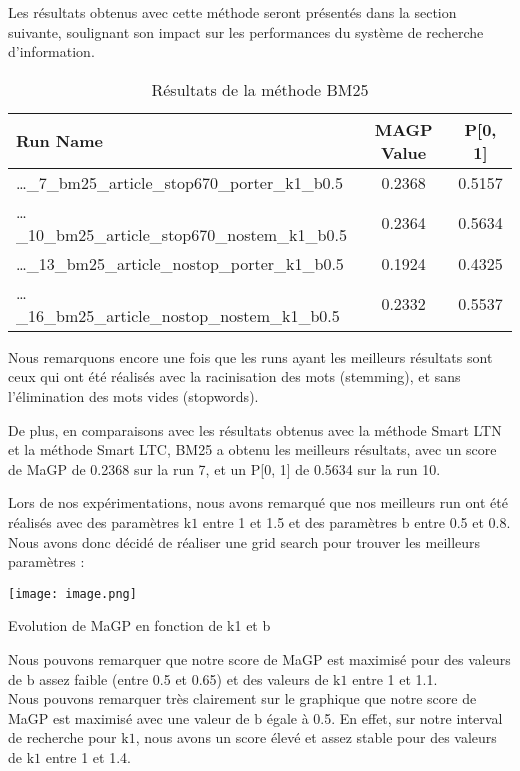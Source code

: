 \documentclass[a4paper, 12pt]{article}
\begin{document}
Les résultats obtenus avec cette méthode seront présentés dans la section suivante,
soulignant son impact sur les performances du système de recherche d'information.


\begin{table}[h]
  \centering
  \begin{tabular}{l c c}
      \toprule
      \textbf{Run Name} & \textbf{MAGP Value} & \textbf{P[0, 1]} \\
      \midrule
      \dots\_7\_bm25\_article\_stop670\_porter\_k1\_b0.5 & 0.2368 & 0.5157 \\
      \dots\_10\_bm25\_article\_stop670\_nostem\_k1\_b0.5 & 0.2364 & 0.5634 \\
      \dots\_13\_bm25\_article\_nostop\_porter\_k1\_b0.5 & 0.1924 & 0.4325 \\
      \dots\_16\_bm25\_article\_nostop\_nostem\_k1\_b0.5 & 0.2332 & 0.5537 \\
      \bottomrule
  \end{tabular}
  \caption{Résultats de la méthode BM25}
  \label{tab:result_bm25}
\end{table}

Nous remarquons encore une fois que les runs ayant les meilleurs résultats sont ceux qui ont été réalisés 
avec la racinisation des mots (stemming), et sans l'élimination des mots vides (stopwords).

De plus, en comparaisons avec les résultats obtenus avec la méthode Smart LTN et la méthode Smart LTC, BM25 
a obtenu les meilleurs résultats, avec un score de MaGP de 0.2368 sur la run 7, et un P[0, 1] de 0.5634 sur la run 10.
 
Lors de nos expérimentations, nous avons remarqué que nos meilleurs run ont été réalisés avec des paramètres $\text{k1}$ entre 1 et 1.5 et des paramètres $\text{b}$ entre 0.5 et 0.8.
Nous avons donc décidé de réaliser une grid search pour trouver les meilleurs paramètres :


\begin{table}[!h]
    \begin{minipage}{0.55\linewidth}
        \centering
        \texttt{[image: image.png]}
        \label{fig:enter-label}
        \caption{Evolution de MaGP en fonction de k1 et b}
    \end{minipage}%
    \hspace{0.05\linewidth} %
    \begin{minipage}{0.45\linewidth}
        Nous pouvons remarquer que notre score de MaGP est maximisé pour des valeurs de $\text{b}$ 
        assez faible (entre 0.5 et 0.65) et des valeurs de $\text{k1}$ entre 1 et 1.1. \\

        Nous pouvons remarquer très clairement sur le graphique que notre score de MaGP est maximisé avec une valeur de $\text{b}$ 
        égale à 0.5. En effet, sur notre interval de recherche pour $\text{k1}$, nous avons un score élevé et assez stable 
        pour des valeurs de $\text{k1}$ entre 1 et 1.4.
    \end{minipage}
\end{table}
\end{document}
